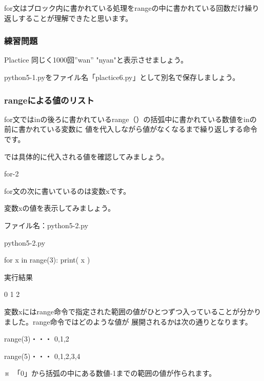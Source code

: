 \documentclass[11pt,a4paper,dvipdfmx,titlepage]{jsreport}
\begin{document}
for文はブロック内に書かれている処理をrangeの中に書かれている回数だけ繰り返しすることが理解できたと思います。
\subsubsection{練習問題}
\begin{plabox}{Plactice}
同じく1000回”wan” "nyan"と表示させましょう。

python5-1.pyをファイル名「plactice6.py」として別名で保存しましょう。

\end{plabox}




\subsubsection{rangeによる値のリスト}
for文ではinの後ろに書かれているrange（）の括弧中に書かれている数値をinの前に書かれている変数に
値を代入しながら値がなくなるまで繰り返しする命令です。

では具体的に代入される値を確認してみましょう。
\begin{pabox}{for-2}

for文の次に書いているのは変数xです。


変数xの値を表示してみましょう。

ファイル名：python5-2.py

\begin{legbox}{python5-2.py}
\begin{listing}{1}
for x in range(3):
    print( x )
\end{listing}

実行結果
\begin{listing}{1}
0
1
2
\end{listing}
\end{legbox}
\end{pabox}
変数xにはrange命令で指定された範囲の値がひとつずつ入っていることが分かりました。range命令ではどのような値が
展開されるかは次の通りとなります。
\begin{description}
\item range(3)・・・ 0,1,2
\item range(5)・・・ 0,1,2,3,4
\end{description}
※　「0」から括弧の中にある数値-1までの範囲の値が作られます。
\end{document}
